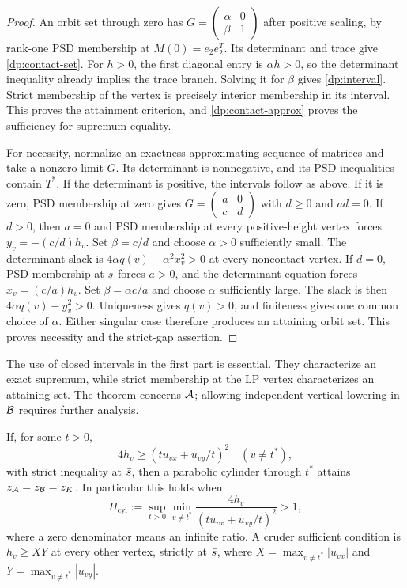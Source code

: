 \begin{proof}
An orbit set through zero has
$G=\left(\begin{smallmatrix}\alpha&0\\\beta&1\end{smallmatrix}\right)$
after positive scaling, by rank-one PSD membership at $M(0)=e_2e_2^T$.
Its determinant and trace give \cref{dp:contact-set}.
For $h>0$, the first diagonal entry is $\alpha h>0$, so the determinant
inequality already implies the trace branch. Solving it for $\beta$ gives
\cref{dp:interval}. Strict membership of the vertex is precisely interior
membership in its interval. This proves the attainment criterion, and
\cref{dp:contact-approx} proves the sufficiency for supremum equality.

For necessity, normalize an exactness-approximating sequence of matrices
and take a nonzero limit $G$. Its determinant is nonnegative, and its PSD
inequalities contain $T^*$. If the determinant is positive, the intervals
follow as above. If it is zero, PSD membership at zero gives
$G=\left(\begin{smallmatrix}a&0\\c&d\end{smallmatrix}\right)$ with
$d\ge0$ and $ad=0$. If $d>0$, then $a=0$ and PSD membership at every
positive-height vertex forces $y_v=-(c/d)h_v$. Set $\beta=c/d$ and
choose $\alpha>0$ sufficiently small. The determinant slack is
$4\alpha q(v)-\alpha^2x_v^2>0$ at every noncontact vertex.
If $d=0$, PSD membership at $\bar s$ forces $a>0$, and the determinant
equation forces $x_v=(c/a)h_v$. Set $\beta=\alpha c/a$ and choose
$\alpha$ sufficiently large. The slack is then
$4\alpha q(v)-y_v^2>0$. Uniqueness gives $q(v)>0$, and finiteness gives
one common choice of $\alpha$. Either singular case therefore produces
an attaining orbit set. This proves necessity and the strict-gap assertion.
\end{proof}

The use of closed intervals in the first part is essential. They characterize
an exact supremum, while strict membership at the LP vertex characterizes an
attaining set. The theorem concerns $\mathcal A$; allowing independent vertical
lowering in $\mathcal B$ requires further analysis.

\begin{corollary}\label{dp:cylinder-contact}
If, for some $t>0$,
\[
 4h_v\ge(tu_{vx}+u_{vy}/t)^2\quad(v\ne t^*),
\]
with strict inequality at $\bar s$, then a parabolic cylinder through $t^*$
attains $z_{\mathcal A}=z_{\mathcal B}=z_K$. In particular this holds when
\[
 H_{\mathrm{cyl}}:=\sup_{t>0}\min_{v\ne t^*}
   \frac{4h_v}{(tu_{vx}+u_{vy}/t)^2}>1,
\]
where a zero denominator means an infinite ratio. A cruder sufficient
condition is $h_v\ge XY$ at every other vertex, strictly at $\bar s$,
where $X=\max_{v\ne t^*}|u_{vx}|$ and $Y=\max_{v\ne t^*}|u_{vy}|$.
\end{corollary}

